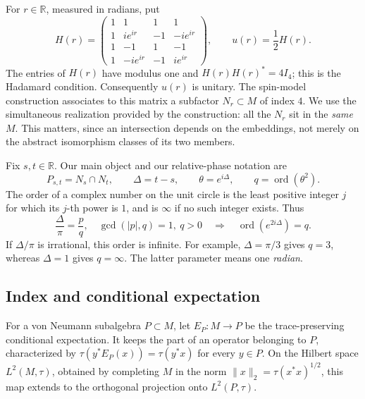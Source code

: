 \documentclass[11pt]{article}
\theoremstyle{definition}
\theoremstyle{remark}
\newcommand{\R}{\mathbb R}
\newcommand{\tr}{\tau}
\newcommand{\ord}{\operatorname{ord}}
\begin{document}
For \(r\in\R\), measured in radians, put
\begin{equation}\label{eq:family}
 H(r)=
 \begin{pmatrix}
 1&1&1&1\\
 1&i e^{ir}&-1&-i e^{ir}\\
 1&-1&1&-1\\
 1&-i e^{ir}&-1&i e^{ir}
 \end{pmatrix},
 \qquad u(r)=\frac12 H(r).
\end{equation}
The entries of \(H(r)\) have modulus one and \(H(r)H(r)^*=4I_4\);
this is the Hadamard condition. Consequently \(u(r)\) is unitary.
The spin-model construction associates to this matrix a subfactor
\(N_r\subset M\) of index \(4\). We use the simultaneous realization
provided by the construction: all the \(N_r\) sit in the \emph{same}
\(M\). This matters, since an intersection depends on the embeddings,
not merely on the abstract isomorphism classes of its two members.

Fix \(s,t\in\R\). Our main object and our relative-phase notation are
\begin{equation}\label{eq:phase}
 P_{s,t}=N_s\cap N_t,\qquad
 \Delta=t-s,\qquad \theta=e^{i\Delta},\qquad
 q=\ord(\theta^2).
\end{equation}
The order of a complex number on the unit circle is the least positive
integer \(j\) for which its \(j\)-th power is \(1\), and is \(\infty\)
if no such integer exists. Thus
\begin{equation}\label{eq:denominator}
 \frac{\Delta}{\pi}=\frac pq,\quad
 \gcd(|p|,q)=1,\ q>0
 \quad\Longrightarrow\quad
 \ord(e^{2i\Delta})=q.
\end{equation}
If \(\Delta/\pi\) is irrational, this order is infinite.
For example, \(\Delta=\pi/3\) gives \(q=3\), whereas \(\Delta=1\)
gives \(q=\infty\). The latter parameter means one \emph{radian}.

\subsection{Index and conditional expectation}
For a von Neumann subalgebra \(P\subset M\), let \(E_P:M\to P\) be
the trace-preserving conditional expectation. It keeps the part of
an operator belonging to \(P\), characterized by
\(\tr(y^*E_P(x))=\tr(y^*x)\) for every \(y\in P\).
On the Hilbert space
\(L^2(M,\tr)\), obtained by completing \(M\) in the norm
\(\|x\|_2=\tr(x^*x)^{1/2}\), this map extends to the orthogonal
projection onto \(L^2(P,\tr)\).
\end{document}
